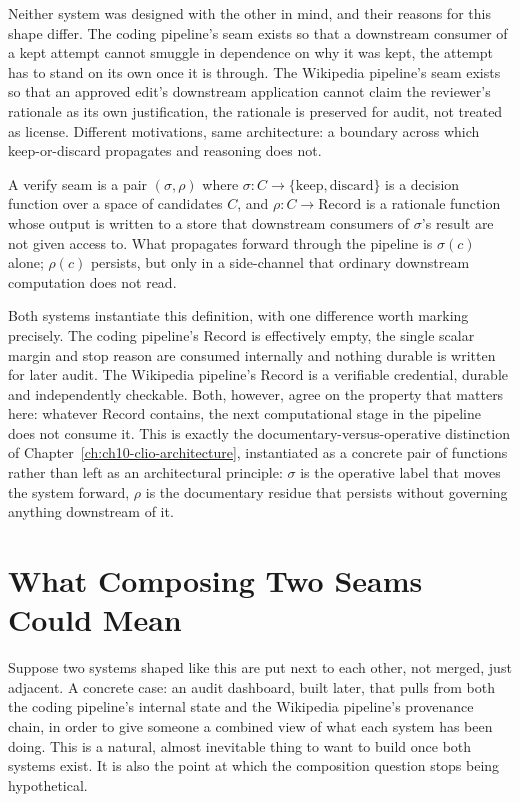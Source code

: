 Neither system was designed with the other in mind, and their reasons for this shape differ. The coding pipeline's seam exists so that a downstream consumer of a kept attempt cannot smuggle in dependence on why it was kept, the attempt has to stand on its own once it is through. The Wikipedia pipeline's seam exists so that an approved edit's downstream application cannot claim the reviewer's rationale as its own justification, the rationale is preserved for audit, not treated as license. Different motivations, same architecture: a boundary across which keep-or-discard propagates and reasoning does not.

\begin{definition}
A verify seam is a pair $(\sigma,\rho)$ where $\sigma : C \to \{\mathrm{keep}, \mathrm{discard}\}$ is a decision function over a space of candidates $C$, and $\rho : C \to \mathrm{Record}$ is a rationale function whose output is written to a store that downstream consumers of $\sigma$'s result are not given access to. What propagates forward through the pipeline is $\sigma(c)$ alone; $\rho(c)$ persists, but only in a side-channel that ordinary downstream computation does not read.
\end{definition}

Both systems instantiate this definition, with one difference worth marking precisely. The coding pipeline's $\mathrm{Record}$ is effectively empty, the single scalar margin and stop reason are consumed internally and nothing durable is written for later audit. The Wikipedia pipeline's $\mathrm{Record}$ is a verifiable credential, durable and independently checkable. Both, however, agree on the property that matters here: whatever $\mathrm{Record}$ contains, the next computational stage in the pipeline does not consume it. This is exactly the documentary-versus-operative distinction of Chapter~\ref{ch:ch10-clio-architecture}, instantiated as a concrete pair of functions rather than left as an architectural principle: $\sigma$ is the operative label that moves the system forward, $\rho$ is the documentary residue that persists without governing anything downstream of it.

\section{What Composing Two Seams Could Mean}

Suppose two systems shaped like this are put next to each other, not merged, just adjacent. A concrete case: an audit dashboard, built later, that pulls from both the coding pipeline's internal state and the Wikipedia pipeline's provenance chain, in order to give someone a combined view of what each system has been doing. This is a natural, almost inevitable thing to want to build once both systems exist. It is also the point at which the composition question stops being hypothetical.

